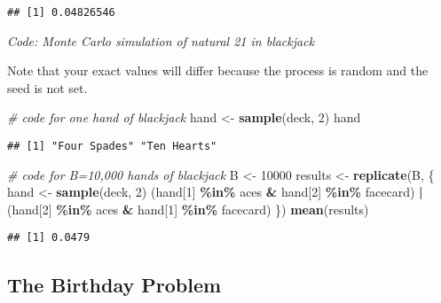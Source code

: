 \documentclass[
]{article}
\newenvironment{Shaded}{\begin{snugshade}}{\end{snugshade}}
\newcommand{\CommentTok}[1]{\textcolor[rgb]{0.56,0.35,0.01}{\textit{#1}}}
\newcommand{\DecValTok}[1]{\textcolor[rgb]{0.00,0.00,0.81}{#1}}
\newcommand{\KeywordTok}[1]{\textcolor[rgb]{0.13,0.29,0.53}{\textbf{#1}}}
\newcommand{\NormalTok}[1]{#1}
\newcommand{\OperatorTok}[1]{\textcolor[rgb]{0.81,0.36,0.00}{\textbf{#1}}}
\newcommand{\StringTok}[1]{\textcolor[rgb]{0.31,0.60,0.02}{#1}}
\begin{document}
\begin{verbatim}
## [1] 0.04826546
\end{verbatim}

\emph{Code: Monte Carlo simulation of natural 21 in blackjack}

Note that your exact values will differ because the process is random
and the seed is not set.

\begin{Shaded}
\begin{Highlighting}[]
\CommentTok{\# code for one hand of blackjack}
\NormalTok{hand \textless{}{-}}\StringTok{ }\KeywordTok{sample}\NormalTok{(deck, }\DecValTok{2}\NormalTok{)}
\NormalTok{hand}
\end{Highlighting}
\end{Shaded}

\begin{verbatim}
## [1] "Four Spades" "Ten Hearts"
\end{verbatim}

\begin{Shaded}
\begin{Highlighting}[]
\CommentTok{\# code for B=10,000 hands of blackjack}
\NormalTok{B \textless{}{-}}\StringTok{ }\DecValTok{10000}
\NormalTok{results \textless{}{-}}\StringTok{ }\KeywordTok{replicate}\NormalTok{(B, \{}
\NormalTok{  hand \textless{}{-}}\StringTok{ }\KeywordTok{sample}\NormalTok{(deck, }\DecValTok{2}\NormalTok{)}
\NormalTok{  (hand[}\DecValTok{1}\NormalTok{] }\OperatorTok{\%in\%}\StringTok{ }\NormalTok{aces }\OperatorTok{\&}\StringTok{ }\NormalTok{hand[}\DecValTok{2}\NormalTok{] }\OperatorTok{\%in\%}\StringTok{ }\NormalTok{facecard) }\OperatorTok{|}\StringTok{ }\NormalTok{(hand[}\DecValTok{2}\NormalTok{] }\OperatorTok{\%in\%}\StringTok{ }\NormalTok{aces }\OperatorTok{\&}\StringTok{ }\NormalTok{hand[}\DecValTok{1}\NormalTok{] }\OperatorTok{\%in\%}\StringTok{ }\NormalTok{facecard)}
\NormalTok{\})}
\KeywordTok{mean}\NormalTok{(results)}
\end{Highlighting}
\end{Shaded}

\begin{verbatim}
## [1] 0.0479
\end{verbatim}

\hypertarget{the-birthday-problem}{%
\subsection{The Birthday Problem}\label{the-birthday-problem}}
\end{document}
